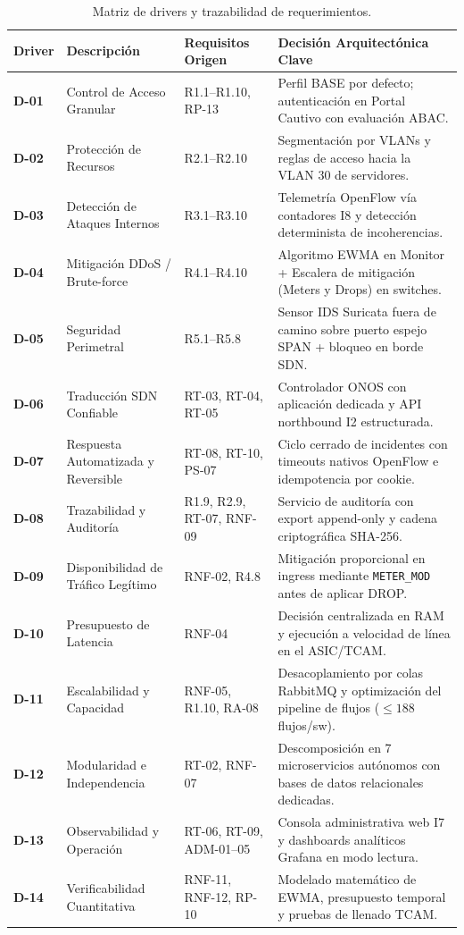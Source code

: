 \documentclass[11pt,a4paper]{report}
\begin{document}
\begin{table}[h!]
\centering
\small
\begin{tabularx}{\linewidth}{p{1.2cm}p{4.2cm}p{3.2cm}X}
\toprule
\textbf{Driver} & \textbf{Descripción} & \textbf{Requisitos Origen} & \textbf{Decisión Arquitectónica Clave} \\
\midrule
\textbf{D-01} & Control de Acceso Granular & R1.1--R1.10, RP-13 & Perfil BASE por defecto; autenticación en Portal Cautivo con evaluación ABAC. \\
\textbf{D-02} & Protección de Recursos & R2.1--R2.10 & Segmentación por VLANs y reglas de acceso hacia la VLAN 30 de servidores. \\
\textbf{D-03} & Detección de Ataques Internos & R3.1--R3.10 & Telemetría OpenFlow vía contadores I8 y detección determinista de incoherencias. \\
\textbf{D-04} & Mitigación DDoS / Brute-force & R4.1--R4.10 & Algoritmo EWMA en Monitor + Escalera de mitigación (Meters y Drops) en switches. \\
\textbf{D-05} & Seguridad Perimetral & R5.1--R5.8 & Sensor IDS Suricata fuera de camino sobre puerto espejo SPAN + bloqueo en borde SDN. \\
\textbf{D-06} & Traducción SDN Confiable & RT-03, RT-04, RT-05 & Controlador ONOS con aplicación dedicada y API northbound I2 estructurada. \\
\textbf{D-07} & Respuesta Automatizada y Reversible & RT-08, RT-10, PS-07 & Ciclo cerrado de incidentes con timeouts nativos OpenFlow e idempotencia por cookie. \\
\textbf{D-08} & Trazabilidad y Auditoría & R1.9, R2.9, RT-07, RNF-09 & Servicio de auditoría con export append-only y cadena criptográfica SHA-256. \\
\textbf{D-09} & Disponibilidad de Tráfico Legítimo & RNF-02, R4.8 & Mitigación proporcional en ingress mediante \texttt{METER\_MOD} antes de aplicar DROP. \\
\textbf{D-10} & Presupuesto de Latencia & RNF-04 & Decisión centralizada en RAM y ejecución a velocidad de línea en el ASIC/TCAM. \\
\textbf{D-11} & Escalabilidad y Capacidad & RNF-05, R1.10, RA-08 & Desacoplamiento por colas RabbitMQ y optimización del pipeline de flujos ($\le 188$ flujos/sw). \\
\textbf{D-12} & Modularidad e Independencia & RT-02, RNF-07 & Descomposición en 7 microservicios autónomos con bases de datos relacionales dedicadas. \\
\textbf{D-13} & Observabilidad y Operación & RT-06, RT-09, ADM-01--05 & Consola administrativa web I7 y dashboards analíticos Grafana en modo lectura. \\
\textbf{D-14} & Verificabilidad Cuantitativa & RNF-11, RNF-12, RP-10 & Modelado matemático de EWMA, presupuesto temporal y pruebas de llenado TCAM. \\
\bottomrule
\end{tabularx}
\caption{Matriz de drivers y trazabilidad de requerimientos.}
\label{tab:drivers}
\end{table}
\end{document}
